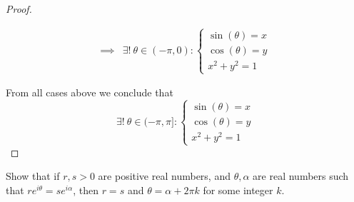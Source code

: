 \begin{proof}
\begin{itemize}
\begin{align*}
                  \implies & \exists!\ \theta \in (-\pi, 0) : \begin{cases}
                      \sin(\theta) = x \\
                      \cos(\theta) = y \\
                      x^2 + y^2 = 1
                  \end{cases}
              \end{align*}
    \end{itemize}
    From all cases above we conclude that
    \[
        \exists!\ \theta \in (-\pi, \pi] : \begin{cases}
            \sin(\theta) = x \\
            \cos(\theta) = y \\
            x^2 + y^2 = 1
        \end{cases}
    \]
\end{proof}

\begin{exercise}\label{ex 4.7.5}
    Show that if \(r, s > 0\) are positive real numbers, and \(\theta, \alpha\) are real numbers such that \(r e^{i \theta} = s e^{i \alpha}\), then \(r = s\) and \(\theta = \alpha + 2 \pi k\) for some integer \(k\).
\end{exercise}

